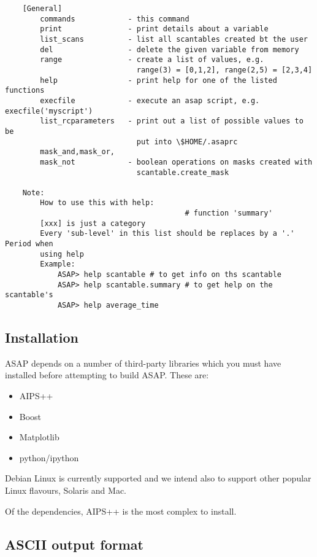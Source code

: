 \documentclass[11pt]{article}
\begin{document}
\begin{verbatim}
    [General]
        commands            - this command
        print               - print details about a variable
        list_scans          - list all scantables created bt the user
        del                 - delete the given variable from memory
        range               - create a list of values, e.g.
                              range(3) = [0,1,2], range(2,5) = [2,3,4]
        help                - print help for one of the listed functions
        execfile            - execute an asap script, e.g. execfile('myscript')
        list_rcparameters   - print out a list of possible values to be
                              put into \$HOME/.asaprc
        mask_and,mask_or,
        mask_not            - boolean operations on masks created with
                              scantable.create_mask

    Note:
        How to use this with help:
                                         # function 'summary'
        [xxx] is just a category
        Every 'sub-level' in this list should be replaces by a '.' Period when
        using help
        Example:
            ASAP> help scantable # to get info on ths scantable
            ASAP> help scantable.summary # to get help on the scantable's
            ASAP> help average_time

\end{verbatim}

\subsection{Installation}

ASAP depends on a number of third-party libraries which you must
have installed before attempting to build ASAP. These are:

\begin{itemize}
\item AIPS++
\item Boost
\item Matplotlib
\item python/ipython
\end{itemize}

Debian Linux is currently supported and we intend also
to support other popular Linux flavours, Solaris and Mac.

Of the dependencies, AIPS++ is the most complex to install.

\subsection{ASCII output format}
\end{document}
